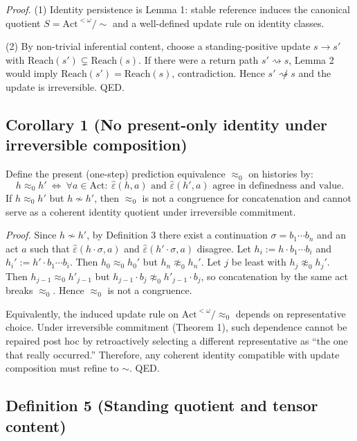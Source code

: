 \documentclass[12pt]{article}
\theoremstyle{plain}
\begin{document}
\textit{Proof.} (1) Identity persistence is Lemma 1: stable reference induces the canonical quotient $S=\mathrm{Act}^{<\omega}/\sim$ and a well-defined update rule on identity classes.

(2) By non-trivial inferential content, choose a standing-positive update $s\to s'$ with $\mathrm{Reach}(s')\subsetneq \mathrm{Reach}(s)$. If there were a return path $s'\rightsquigarrow s$, Lemma 2 would imply $\mathrm{Reach}(s')=\mathrm{Reach}(s)$, contradiction. Hence $s'\not\rightsquigarrow s$ and the update is irreversible. QED.

\subsection{Corollary 1 (No present-only identity under irreversible composition)}

Define the present (one-step) prediction equivalence $\approx_0$ on histories by:
\[
 h\approx_0 h'\ \Longleftrightarrow\ \forall a\in\mathrm{Act}:\ \widehat\varepsilon(h,a)\text{ and }\widehat\varepsilon(h',a)\text{ agree in definedness and value.}
\]
If $h\approx_0 h'$ but $h\not\sim h'$, then $\approx_0$ is not a congruence for concatenation and cannot serve as a coherent identity quotient under irreversible commitment.

\textit{Proof.} Since $h\not\sim h'$, by Definition 3 there exist a continuation $\sigma=b_1\cdots b_n$ and an act $a$ such that $\widehat\varepsilon(h\cdot\sigma,a)$ and $\widehat\varepsilon(h'\cdot\sigma,a)$ disagree. Let $h_i:=h\cdot b_1\cdots b_i$ and $h_i':=h'\cdot b_1\cdots b_i$. Then $h_0\approx_0 h_0'$ but $h_n\not\approx_0 h_n'$. Let $j$ be least with $h_j\not\approx_0 h_j'$. Then $h_{j-1}\approx_0 h'_{j-1}$ but $h_{j-1}\cdot b_j\not\approx_0 h'_{j-1}\cdot b_j$, so concatenation by the same act breaks $\approx_0$. Hence $\approx_0$ is not a congruence.

Equivalently, the induced update rule on $\mathrm{Act}^{<\omega}/\approx_0$ depends on representative choice. Under irreversible commitment (Theorem 1), such dependence cannot be repaired post hoc by retroactively selecting a different representative as ``the one that really occurred.'' Therefore, any coherent identity compatible with update composition must refine to $\sim$. QED.

\subsection{Definition 5 (Standing quotient and tensor content)}
\end{document}
